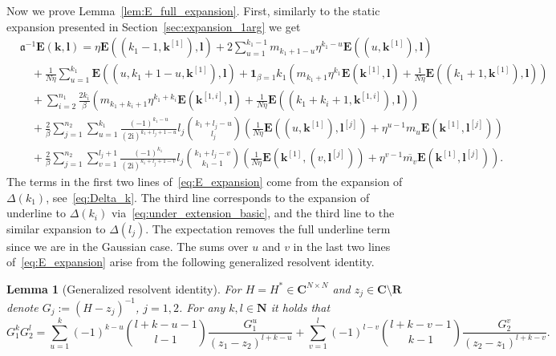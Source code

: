 \documentclass[10pt]{amsart}
\newtheorem{lemma}[theorem]{Lemma}
\numberwithin{equation}{section}
\newcommand{\E}{\mathbf{E}}
\newcommand{\R}{\mathbf{R}}
\newcommand{\C}{\mathbf{C}}
\newcommand{\N}{\mathbf{N}}
\newcommand{\ma}{\mathfrak{a}}
\newcommand{\ii}{\mathrm{i}}
\begin{document}
Now we prove Lemma~\ref{lem:E_full_expansion}. 
First, similarly to the static expansion presented in Section~\ref{sec:expansion_1arg} we get
\begin{equation}
\begin{split}
&\ma^{-1}\E(\bm{k},\bm{l}) = \eta \E\left((k_1-1,\bm{k}^{[1]}), \bm{l}\right) + 2\sum_{u=1}^{k_1-1} m_{k_1+1-u} \eta^{k_1-u} \E\left((u,\bm{k}^{[1]}),\bm{l}\right)\\
&\quad +\frac{1}{N\eta}\sum_{u=1}^{k_1}\E\left((u,k_1+1-u,\bm{k}^{[1]}),\bm{l}\right)+\bm{1}_{\beta=1} k_1\left( m_{k_1+1}\eta^{k_1}\E\left(\bm{k}^{[1]},\bm{l}\right) + \frac{1}{N\eta}\E\left((k_1+1,\bm{k}^{[1]}),\bm{l}\right)\right)\\
&\quad  +\sum_{i=2}^{n_1}\frac{2k_i}{\beta} \left(m_{k_1+k_i+1}\eta^{k_1+k_i}\E\left(\bm{k}^{[1,i]},\bm{l}\right)+\frac{1}{N\eta}\E\left((k_1+k_i+1,\bm{k}^{[1,i]}),\bm{l}\right)\right)\\
&\quad  +\frac{2}{\beta}\sum_{j=1}^{n_2}\sum_{u=1}^{k_1}\frac{(-1)^{k_1-u}}{(2\ii)^{k_1+l_j+1-u}} l_j\binom{k_1+l_j-u}{l_j}\left(\frac{1}{N\eta}\E\left((u,\bm{k}^{[1]}),\bm{l}^{[j]}\right) + \eta^{u-1}m_u \E \left(\bm{k}^{[1]},\bm{l}^{[j]}\right)\right)\\
&\quad  +\frac{2}{\beta}\sum_{j=1}^{n_2}\sum_{v=1}^{l_j+1}\frac{(-1)^{k_1}}{(2\ii)^{k_1+l_j+1-v}}l_j\binom{k_1+l_j-v}{k_1-1}\left(\frac{1}{N\eta} \E\left(\bm{k}^{[1]},(v,\bm{l}^{[j]})\right) + \eta^{v-1}\overline{m_v}\E\left(\bm{k}^{[1]},\bm{l}^{[j]}\right)\right).
\end{split}
\label{eq:E_expansion}
\end{equation}
The terms in the first two lines of~\eqref{eq:E_expansion} come from the expansion of $\Delta(k_1)$, see~\eqref{eq:Delta_k}. The third line corresponds to the expansion of underline to $\Delta(k_i)$ via~\eqref{eq:under_extension_basic}, and the third line to the similar expansion to $\Delta(l_j)$. The expectation removes the full underline term since 
we are in the Gaussian case. The sums over $u$ and $v$ in the last two lines of~\eqref{eq:E_expansion} arise from the following generalized resolvent identity.

\begin{lemma}[Generalized resolvent identity]\label{lem:resolvent_id} For $H=H^*\in\C^{N\times N}$ and $z_j\in\C\setminus\R$ denote $G_j:=(H-z_j)^{-1}$, $j=1,2$. For any $k,l\in\N$ it holds that
\begin{equation}
G_1^kG_2^l = \sum_{u=1}^k (-1)^{k-u} \binom{l+k-u-1}{l-1} \frac{G_1^u}{(z_1-z_2)^{l+k-u}} + \sum_{v=1}^l (-1)^{l-v} \binom{l+k-v-1}{k-1} \frac{G_2^v}{(z_2-z_1)^{l+k-v}}.
\label{eq:resolvent_id}
\end{equation}
\end{lemma}
\end{document}
